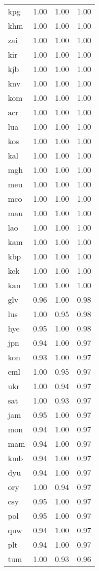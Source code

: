 \begin{table}
\begin{tabular}{lrrr}
kpg & 1.00 & 1.00 & 1.00 \\
khm & 1.00 & 1.00 & 1.00 \\
zai & 1.00 & 1.00 & 1.00 \\
kir & 1.00 & 1.00 & 1.00 \\
kjb & 1.00 & 1.00 & 1.00 \\
knv & 1.00 & 1.00 & 1.00 \\
kom & 1.00 & 1.00 & 1.00 \\
acr & 1.00 & 1.00 & 1.00 \\
lua & 1.00 & 1.00 & 1.00 \\
kos & 1.00 & 1.00 & 1.00 \\
kal & 1.00 & 1.00 & 1.00 \\
mgh & 1.00 & 1.00 & 1.00 \\
meu & 1.00 & 1.00 & 1.00 \\
mco & 1.00 & 1.00 & 1.00 \\
mau & 1.00 & 1.00 & 1.00 \\
lao & 1.00 & 1.00 & 1.00 \\
kam & 1.00 & 1.00 & 1.00 \\
kbp & 1.00 & 1.00 & 1.00 \\
kek & 1.00 & 1.00 & 1.00 \\
kan & 1.00 & 1.00 & 1.00 \\
glv & 0.96 & 1.00 & 0.98 \\
lus & 1.00 & 0.95 & 0.98 \\
hye & 0.95 & 1.00 & 0.98 \\
jpn & 0.94 & 1.00 & 0.97 \\
kon & 0.93 & 1.00 & 0.97 \\
eml & 1.00 & 0.95 & 0.97 \\
ukr & 1.00 & 0.94 & 0.97 \\
sat & 1.00 & 0.93 & 0.97 \\
jam & 0.95 & 1.00 & 0.97 \\
mon & 0.94 & 1.00 & 0.97 \\
mam & 0.94 & 1.00 & 0.97 \\
kmb & 0.94 & 1.00 & 0.97 \\
dyu & 0.94 & 1.00 & 0.97 \\
ory & 1.00 & 0.94 & 0.97 \\
csy & 0.95 & 1.00 & 0.97 \\
pol & 0.95 & 1.00 & 0.97 \\
quw & 0.94 & 1.00 & 0.97 \\
plt & 0.94 & 1.00 & 0.97 \\
tum & 1.00 & 0.93 & 0.96 \\

\end{tabular}
\end{table}
